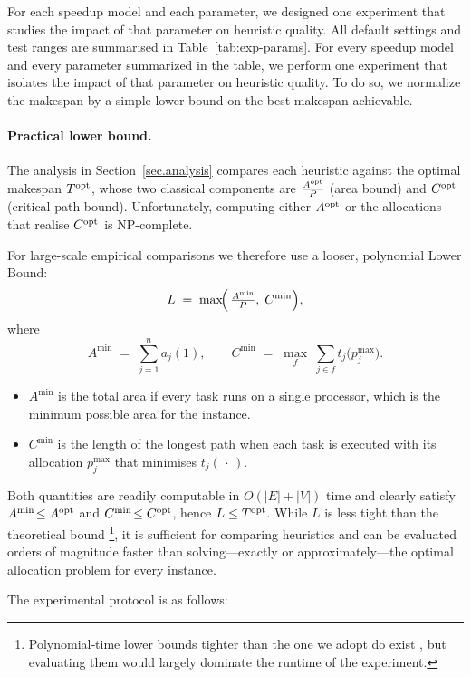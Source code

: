 \documentclass{article}
\newcommand\opt{\textnormal{opt}\xspace}
\begin{document}
For each speedup model and each parameter, we designed one experiment that
studies the impact of that parameter on heuristic quality.
All default settings and test ranges are summarised in
Table~\ref{tab:exp-params}.
For every speedup model and every parameter summarized in the table, we perform one experiment that isolates the impact
of that parameter on heuristic quality. To do so, we normalize the makespan by a simple lower bound on the best makespan achievable.

\paragraph{Practical lower bound.}
The analysis in Section~\ref{sec.analysis} compares each heuristic against the
optimal makespan \(T^{\opt}\), whose two classical components are
\(\tfrac{A^{\opt}}{P}\) (area bound) and \(C^{\opt}\) (critical-path bound).
Unfortunately, computing either \(A^{\opt}\) or the allocations that realise
\(C^{\opt}\) is NP-complete.%

For large-scale empirical comparisons we therefore use a
looser, polynomial Lower Bound:
\[
L \;=\;
\max\!\Bigl(\,
  \tfrac{A^{\min}}{P},\;
  C^{\min}
\Bigr),
\]
where
\[
A^{\min} \;=\;
\sum_{j=1}^{n} a_j(1),  \qquad
C^{\min} \;=\;
\max_{f}\;
\sum_{j\in f}\!
      t_j\!\bigl(p_j^{\max}\bigr).
\]
\begin{itemize}
  \item \(A^{\min}\) is the total area if every task runs on a single
        processor, which is the minimum possible area for the instance.
  \item \(C^{\min}\) is the length of the longest path when each task is
        executed with its allocation \(p_j^{\max}\) that minimises
        \(t_j(\,\cdot\,)\).
\end{itemize}
Both quantities are readily computable in \(O(|E|+|V|)\) time and clearly
satisfy \(A^{\min}\!\le A^{\opt}\) and \(C^{\min}\!\le C^{\opt}\), hence
\(L\le T^{\opt}\).  While \(L\) is less tight than the theoretical bound \footnote{%
  Polynomial‐time lower bounds tighter than the one we adopt do exist
  \cite{Lepere}, but evaluating them would largely dominate the runtime of the experiment.}, it
is sufficient for comparing heuristics and can be evaluated orders of
magnitude faster than solving—exactly or approximately—the optimal allocation
problem for every instance.

The experimental protocol is as follows:
\end{document}

